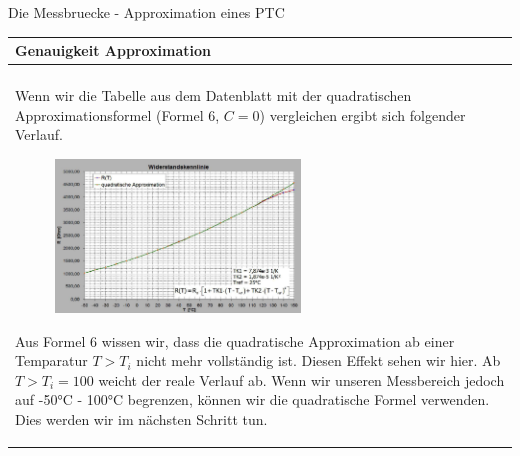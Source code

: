 \begin{frame}[t]{Die Messbruecke - Approximation eines PTC}

    \begin{spacing}{0.9} \begin{tiny}
            \begin{table}[h!]
                \begin{tabular}{p{10cm}}
                    \hline
                    \textbf{Genauigkeit Approximation} \\
                    \hline                             \\
                    \begin{minipage}{\textwidth}
                        Wenn wir die Tabelle aus dem Datenblatt mit der quadratischen Approximationsformel (Formel 6, $C=0$) vergleichen ergibt sich folgender Verlauf.
                        \begin{figure}
                            \centering
                            \includegraphics[width=0.6\textwidth]{pictures/kty81_approx_accuracy.png}
                        \end{figure}
                        Aus Formel 6 wissen wir, dass die quadratische Approximation ab einer Temparatur $T>T_i$ nicht mehr vollständig ist.
                        Diesen Effekt sehen wir hier. Ab $T>T_i=100$ weicht der reale Verlauf ab. Wenn wir unseren Messbereich jedoch auf -50$°$C - 100$°$C begrenzen, können
                        wir die quadratische Formel verwenden. \newline\newline Dies werden wir im nächsten Schritt tun.
                    \end{minipage}
                \end{tabular}

            \end{table}

        \end{tiny} \end{spacing}

\end{frame}


